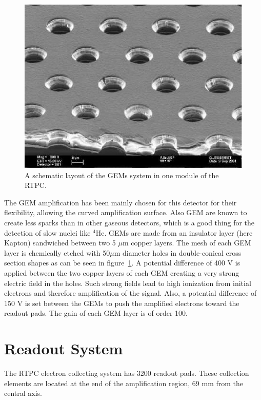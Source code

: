 \documentclass[twocolumn,showpacs,superscriptaddress,groupedaddress]{revtex4}
\begin{document}
\begin{figure}[tbp]
\centering
\includegraphics[scale=0.70]{fig/GEM_photo.jpg}
\caption{A schematic layout of the GEMs system in one module of the RTPC.} 
\label{fig:GEMs}
\end{figure}

The GEM amplification has been mainly chosen for this detector for their 
flexibility, allowing the curved amplification surface. Also GEM are known to 
create less sparks than in other gaseous detectors, which is a good thing for 
the detection of slow nuclei like $^4$He. GEMs are made from an insulator layer 
(here Kapton) sandwiched between two 5 $\mu$m copper layers. The mesh of each 
GEM layer is chemically etched with 50$\mu$m diameter holes in double-conical 
cross section shapes as can be seen in figure~\ref{fig:GEMs}. A potential 
difference of 400 V is applied between the two copper layers of each GEM 
creating a very strong electric field in the holes. Such strong fields lead to 
high ionization from initial electrons and therefore amplification of the 
signal. Also, a potential difference of 150 V is set between the GEMs to push 
the amplified electrons toward the readout pads. The gain of each GEM layer is 
of order 100.\\

\section{Readout System} \label{sec_readout}
The RTPC electron collecting system has 3200 readout pads. These collection 
elements are located at the end of the amplification region, 69 mm from the 
central axis.
\end{document}
